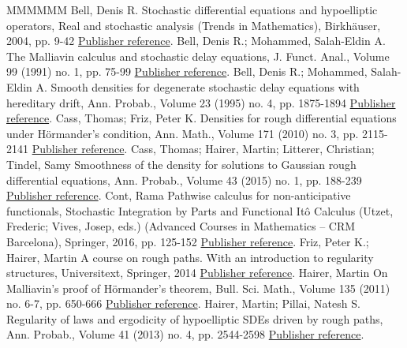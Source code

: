 \begin{thebibliography}{MMMMMM}
 Bell, Denis R. Stochastic differential equations and hypoelliptic operators, Real and stochastic analysis (Trends in Mathematics), Birkhäuser, 2004, pp. 9-42 \href{https://ahl.centre-mersenne.org/item/AHL_2020__3__1023_0/#Bell}{Publisher reference}.
 Bell, Denis R.; Mohammed, Salah-Eldin A. The Malliavin calculus and stochastic delay equations, J. Funct. Anal., Volume 99 (1991) no. 1, pp. 75-99 \href{https://ahl.centre-mersenne.org/item/AHL_2020__3__1023_0/#BelMo91}{Publisher reference}.
 Bell, Denis R.; Mohammed, Salah-Eldin A. Smooth densities for degenerate stochastic delay equations with hereditary drift, Ann. Probab., Volume 23 (1995) no. 4, pp. 1875-1894 \href{https://ahl.centre-mersenne.org/item/AHL_2020__3__1023_0/#BelMo95}{Publisher reference}.
 Cass, Thomas; Friz, Peter K. Densities for rough differential equations under Hörmander’s condition, Ann. Math., Volume 171 (2010) no. 3, pp. 2115-2141 \href{https://ahl.centre-mersenne.org/item/AHL_2020__3__1023_0/#CT10}{Publisher reference}.
 Cass, Thomas; Hairer, Martin; Litterer, Christian; Tindel, Samy Smoothness of the density for solutions to Gaussian rough differential equations, Ann. Probab., Volume 43 (2015) no. 1, pp. 188-239 \href{https://ahl.centre-mersenne.org/item/AHL_2020__3__1023_0/#CHLT15}{Publisher reference}.
 Cont, Rama Pathwise calculus for non-anticipative functionals, Stochastic Integration by Parts and Functional Itô Calculus (Utzet, Frederic; Vives, Josep, eds.) (Advanced Courses in Mathematics – CRM Barcelona), Springer, 2016, pp. 125-152 \href{https://ahl.centre-mersenne.org/item/AHL_2020__3__1023_0/#bally2016pathwise}{Publisher reference}.
 Friz, Peter K.; Hairer, Martin A course on rough paths. With an introduction to regularity structures, Universitext, Springer, 2014 \href{https://ahl.centre-mersenne.org/item/AHL_2020__3__1023_0/#FH14}{Publisher reference}.
 Hairer, Martin On Malliavin’s proof of Hörmander’s theorem, Bull. Sci. Math., Volume 135 (2011) no. 6-7, pp. 650-666 \href{https://ahl.centre-mersenne.org/item/AHL_2020__3__1023_0/#Hairer11}{Publisher reference}.
 Hairer, Martin; Pillai, Natesh S. Regularity of laws and ergodicity of hypoelliptic SDEs driven by rough paths, Ann. Probab., Volume 41 (2013) no. 4, pp. 2544-2598 \href{https://ahl.centre-mersenne.org/item/AHL_2020__3__1023_0/#HP13}{Publisher reference}.

\end{thebibliography}
